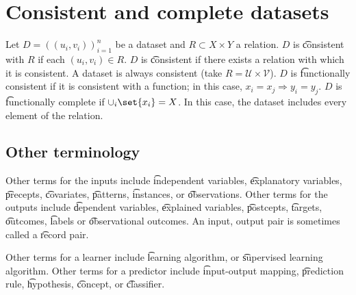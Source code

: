 \section*{Consistent and complete datasets}

Let $D = ((u_i, v_i))_{i = 1}^{n}$ be a dataset and $R \subset X \times  Y$ a relation.
$D$ is \t{consistent with $R$} if each $(u_i, v_i) \in R$.
$D$ is \t{consistent} if there exists a relation with which it is consistent.
A dataset is always consistent (take $R = \mathcal{U}  \times \mathcal{V} $).
$D$ is \t{functionally consistent} if it is consistent with a function; in this case, $x_i = x_j \Rightarrow y_i = y_j$.
$D$ is \t{functionally complete} if $\cup_i\set{x_i} = X$.
In this case, the dataset includes every element of the relation.

\subsection*{Other terminology}

Other terms for the inputs include \t{independent variables}, \t{explanatory variables}, \t{precepts}, \t{covariates}, \t{patterns}, \t{instances}, or \t{observations}.
Other terms for the outputs include \t{dependent variables}, \t{explained variables}, \t{postcepts}, \t{targets}, \t{outcomes}, \t{labels} or \t{observational outcomes}.
An input, output pair is sometimes called a \t{record pair}.

Other terms for a learner include \t{learning algorithm}, or \t{supervised learning algorithm}.
Other terms for a predictor include \t{input-output} mapping, \t{prediction rule}, \t{hypothesis}, \t{concept}, or \t{classifier}.
